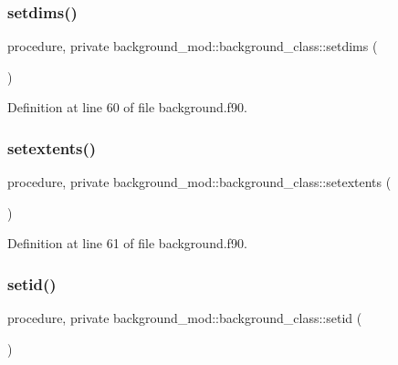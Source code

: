 \subsubsection{\texorpdfstring{setdims()}{setdims()}}
{\footnotesize\ttfamily procedure, private background\+\_\+mod\+::background\+\_\+class\+::setdims (\begin{DoxyParamCaption}{ }\end{DoxyParamCaption})\hspace{0.3cm}{\ttfamily [private]}}



Definition at line 60 of file background.\+f90.

\mbox{\label{structbackground__mod_1_1background__class_a2265e90a0a0685465a17721576919af5}} 
\subsubsection{\texorpdfstring{setextents()}{setextents()}}
{\footnotesize\ttfamily procedure, private background\+\_\+mod\+::background\+\_\+class\+::setextents (\begin{DoxyParamCaption}{ }\end{DoxyParamCaption})\hspace{0.3cm}{\ttfamily [private]}}



Definition at line 61 of file background.\+f90.

\mbox{\label{structbackground__mod_1_1background__class_aa9fde21edbd805c17a6610d9db2ef4a4}} 
\subsubsection{\texorpdfstring{setid()}{setid()}}
{\footnotesize\ttfamily procedure, private background\+\_\+mod\+::background\+\_\+class\+::setid (\begin{DoxyParamCaption}{ }\end{DoxyParamCaption})\hspace{0.3cm}{\ttfamily [private]}}




